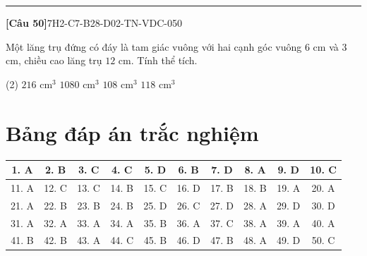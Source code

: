 \documentclass[12pt,a4paper]{article}
\newif\ifloigiai
\newenvironment{cauhoi}[2]{%
  \par\medskip\noindent\rule{\textwidth}{0.4pt}\par\nopagebreak
  \noindent\textbf{[#1]}\hfill{\scriptsize\ttfamily #2}\par\nopagebreak\smallskip}{\par}
\newcommand{\dapan}[1]{\ifloigiai\par\smallskip\noindent\textit{Đáp án:} \textbf{#1}\par\fi}
\begin{document}
\begin{cauhoi}{Câu 50}{7H2-C7-B28-D02-TN-VDC-050}
Một lăng trụ đứng có đáy là tam giác vuông với hai cạnh góc vuông $6$ cm và $3$ cm, chiều cao lăng trụ $12$ cm. Tính thể tích.
\begin{tasks}(2)
\task $216\text{ cm}^3$
\task $1080\text{ cm}^3$
\task $108\text{ cm}^3$
\task $118\text{ cm}^3$
\end{tasks}
\dapan{C}
\end{cauhoi}
\clearpage\section*{Bảng đáp án trắc nghiệm}
\begin{center}\begin{tabular}{|c|c|c|c|c|c|c|c|c|c|}
\hline
1. A & 2. B & 3. C & 4. C & 5. D & 6. B & 7. D & 8. A & 9. D & 10. C\\\hline
11. A & 12. C & 13. C & 14. B & 15. C & 16. D & 17. B & 18. B & 19. A & 20. A\\\hline
21. A & 22. B & 23. B & 24. B & 25. D & 26. C & 27. D & 28. A & 29. D & 30. D\\\hline
31. A & 32. A & 33. A & 34. A & 35. B & 36. A & 37. C & 38. A & 39. A & 40. A\\\hline
41. B & 42. B & 43. A & 44. C & 45. B & 46. D & 47. B & 48. A & 49. D & 50. C\\\hline
\end{tabular}\end{center}
\end{document}
